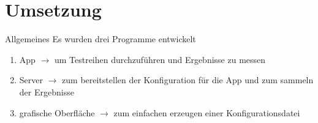 \section{Umsetzung}

\begin{frame}{Allgemeines}
	Es wurden drei Programme entwickelt
	\pause
	\begin{enumerate}[<+->]
	\item App $\rightarrow$ um Testreihen durchzuführen und Ergebnisse zu messen
	\item Server $\rightarrow$ zum bereitstellen der Konfiguration für die App und zum sammeln der Ergebnisse
	\item grafische Oberfläche $\rightarrow$ zum einfachen erzeugen einer Konfigurationsdatei
	\end{enumerate}
\end{frame}